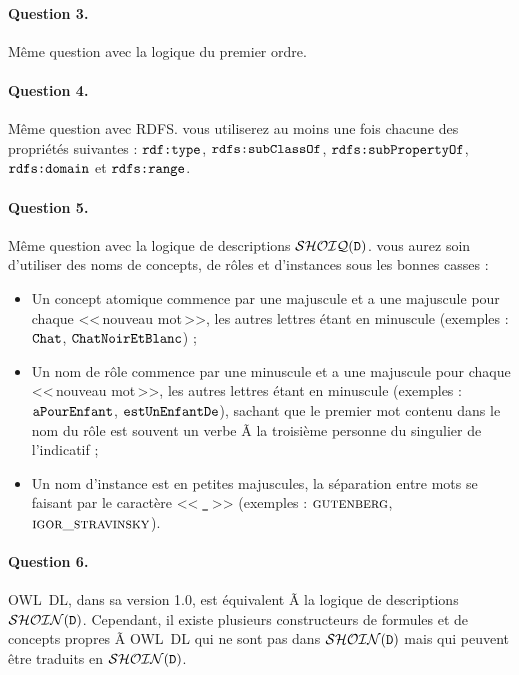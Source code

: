 \documentclass[11pt, a4paper]{article}
\def\fm#1{\text{\texttt{#1}}}
\def\SHOIND{{\mathcal{SHOIN}}(\fm{D})}
\def\SHOIQD{{\mathcal{SHOIQ}}(\fm{D})}
\begin{document}
	\paragraph{Question 3.}
	Même question avec la logique du premier ordre.
	
	\paragraph{Question 4.}
	Même question avec RDFS.
	vous utiliserez au moins une fois chacune des propriétés
	suivantes :
	$\fm{rdf:type}$,
	$\fm{rdfs:subClassOf}$,
	$\fm{rdfs:subPropertyOf}$,
	$\fm{rdfs:domain}$ et
	$\fm{rdfs:range}$.
	
	\paragraph{Question 5.}
	Même question avec la logique de descriptions $\SHOIQD$.
	vous aurez soin d'utiliser des noms de concepts, de rôles et
	d'instances sous les bonnes casses :
	\begin{itemize}
		\item
		Un concept atomique commence par une majuscule et a une
		majuscule pour chaque <<\,nouveau mot\,>>, les autres
		lettres étant en minuscule
		(exemples : $\fm{Chat}$, $\fm{ChatNoirEtBlanc}$) ;
		\item
		Un nom de rôle commence par une minuscule et a une
		majuscule pour chaque <<\,nouveau mot\,>>, les autres
		lettres étant en minuscule
		(exemples : $\fm{aPourEnfant}$, $\fm{estUnEnfantDe}$),
		sachant que le premier mot contenu dans le nom du rôle est
		souvent un verbe Ã  la troisième personne du singulier de
		l'indicatif ;
		\item
		Un nom d'instance est en petites majuscules, la séparation
		entre mots se faisant par le caractère <<\,$\fm{\_}$\,>>
		(exemples : $\text{\textsc{gutenberg}}$,
		$\text{\textsc{igor\_stravinsky}}$).
	\end{itemize}
	
	\paragraph{Question 6.}
	OWL~DL, dans sa version 1.0, est équivalent Ã  la logique de descriptions
	$\SHOIND$.
	Cependant, il existe plusieurs constructeurs de formules et de concepts
	propres Ã  OWL~DL qui ne sont pas dans $\SHOIND$ mais qui peuvent être
	traduits en $\SHOIND$.
	
\end{document}

